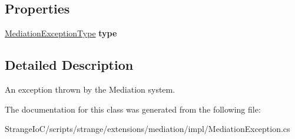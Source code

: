 \subsection*{Properties}
\begin{DoxyCompactItemize}
\item 
\hypertarget{classstrange_1_1extensions_1_1mediation_1_1impl_1_1_mediation_exception_aa23e9c77b69d735c3aaa1b32253b1555}{\hyperlink{namespacestrange_1_1extensions_1_1mediation_1_1api_aef97993ec02a40c5f887dbfaf4f06e4a}{Mediation\-Exception\-Type} {\bfseries type}}\label{classstrange_1_1extensions_1_1mediation_1_1impl_1_1_mediation_exception_aa23e9c77b69d735c3aaa1b32253b1555}

\end{DoxyCompactItemize}


\subsection{Detailed Description}
An exception thrown by the Mediation system. 

The documentation for this class was generated from the following file\-:\begin{DoxyCompactItemize}
\item 
Strange\-Io\-C/scripts/strange/extensions/mediation/impl/Mediation\-Exception.\-cs\end{DoxyCompactItemize}
